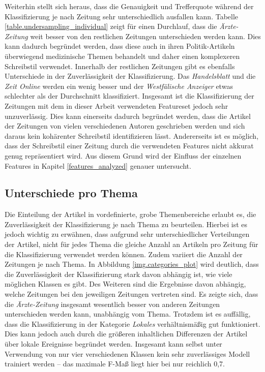 Weiterhin stellt sich heraus, dass die Genauigkeit und Trefferquote während der Klassifizierung je nach Zeitung sehr unterschiedlich ausfallen kann. Tabelle \ref{table.undersampling_individual} zeigt für einen Durchlauf, dass die \emph{Ärzte-Zeitung} weit besser von den restlichen Zeitungen unterschieden werden kann. Dies kann dadurch begründet werden, dass diese auch in ihren Politik-Artikeln überwiegend medizinische Themen behandelt und daher einen komplexeren Schreibstil verwendet. Innerhalb der restlichen Zeitungen gibt es ebenfalls Unterschiede in der Zuverlässigkeit der Klassifizierung. Das \emph{Handelsblatt} und die \emph{Zeit Online} werden ein wenig besser und der \emph{Westfälische Anzeiger} etwas schlechter als der Durchschnitt klassifiziert. Insgesamt ist die Klassifizierung der Zeitungen mit dem in dieser Arbeit verwendeten Featureset jedoch sehr unzuverlässig. Dies kann einerseits dadurch begründet werden, dass die Artikel der Zeitungen von vielen verschiedenen Autoren geschrieben werden und sich daraus kein kohärenter Schreibstil identifizieren lässt. Andererseits ist es möglich, dass der Schreibstil einer Zeitung durch die verwendeten Features nicht akkurat genug repräsentiert wird. Aus diesem Grund wird der Einfluss der einzelnen Features in Kapitel \ref{features_analyzed} genauer untersucht.

\subsection{Unterschiede pro Thema}
Die Einteilung der Artikel in vordefinierte, grobe Themenbereiche erlaubt es, die Zuverlässigkeit der Klassifizierung je nach Thema zu beurteilen. Hierbei ist es jedoch wichtig zu erwähnen, dass aufgrund sehr unterschiedlicher Verteilungen der Artikel, nicht für jedes Thema die gleiche Anzahl an Artikeln pro Zeitung für die Klassifizierung verwendet werden können. Zudem variiert die Anzahl der Zeitungen je nach Thema. In Abbildung \ref{img.categories_plot} wird deutlich, dass die Zuverlässigkeit der Klassifizierung stark davon abhängig ist, wie viele möglichen Klassen es gibt. Des Weiteren sind die Ergebnisse davon abhängig, welche Zeitungen bei den jeweiligen Zeitungen vertreten sind. Es zeigte sich, dass die \emph{Ärzte-Zeitung} insgesamt wesentlich besser von anderen Zeitungen unterschieden werden kann, unabhängig vom Thema. Trotzdem ist es auffällig, dass die Klassifizierung in der Kategorie \emph{Lokales} verhältnismäßig gut funktioniert. Dies kann jedoch auch durch die größeren inhaltlichen Differenzen der Artikel über lokale Ereignisse begründet werden. Insgesamt kann selbst unter Verwendung von nur vier verschiedenen Klassen kein sehr zuverlässiges Modell trainiert werden -- das maximale F-Maß liegt hier bei nur reichlich 0,7.

